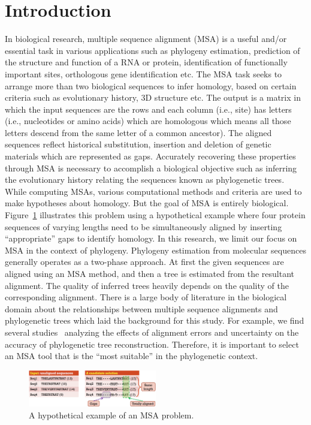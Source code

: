 \section{Introduction}
\label{sec:introducntion}
In biological research, multiple sequence alignment (MSA) is a useful and/or essential task in various applications such as phylogeny estimation, prediction of the structure and function of a RNA or protein, identification of functionally important sites, orthologous gene identification etc. The MSA task seeks to arrange more than two biological sequences to infer homology, based on certain criteria such as evolutionary history, 3D structure etc. The output is a matrix in which the input sequences are the rows and each column (i.e., site) has letters (i.e., nucleotides or amino acids) which are homologous which means all those letters descend from the same letter of a common ancestor). The aligned sequences reflect historical substitution, insertion and deletion of genetic materials which are represented as gaps. Accurately recovering these properties through MSA is necessary to accomplish a biological objective such as inferring the evolutionary history relating the sequences known as phylogenetic trees. While computing MSAs, various computational methods and criteria are used to make hypotheses about homology. But the goal of MSA is entirely biological. Figure~\ref{fig:msa_io} illustrates this problem using a hypothetical example where four protein sequences of varying lengths need to be simultaneously aligned by inserting ``appropriate'' gaps to identify homology. In this research, we limit our focus on MSA in the context of phylogeny. Phylogeny estimation from molecular sequences generally operates as a two-phase approach. At first the given sequences are aligned using an MSA method, and then a tree is estimated from the resultant alignment. The quality of inferred trees heavily depends on the quality of the corresponding alignment. There is a large body of literature in the biological domain about the relationships between multiple sequence alignments and phylogenetic trees which laid the background for this study. For example, we find several studies~\cite{jordan2011effects, chang2014tcs, lake1991order, croan1997evolution, ogden2006multiple, wu2012accounting} analyzing the effects of alignment errors and uncertainty on the accuracy of phylogenetic tree reconstruction. Therefore, it is important to select an MSA tool that is the ``most suitable'' in the phylogenetic context.

\begin{figure}[!htbp]
	\begin{adjustwidth}{-0.2cm}{-0.2cm}
		\includegraphics[width=0.5\textwidth]{Figure/msa_io}
		\caption{A hypothetical example of an MSA problem.} 
		\label{fig:msa_io}
	\end{adjustwidth}
\end{figure}

